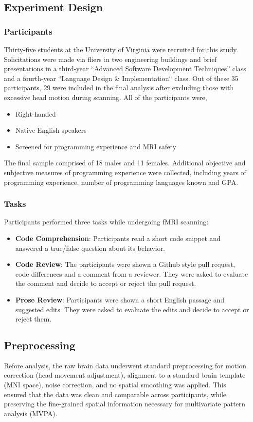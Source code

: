 \subsection{Experiment Design}
\subsubsection{Participants}
Thirty-five students at the University of Virginia were recruited for this study. Solicitations were made via fliers in two engineering buildings and brief presentations in a third-year “Advanced Software Development Techniques” class and a fourth-year “Language Design \& Implementation“ class. Out of these 35 participants, 29 were included in the final analysis after excluding those with excessive head motion during scanning. All of the participants were,
\begin{itemize}
    \item Right-handed
    \item Native English speakers
    \item Screened for programming experience and MRI safety
\end{itemize}
The final sample comprised of 18 males and 11 females. Additional objective and subjective measures of programming experience were collected, including years of programming experience, number of programming languages known and GPA.
\subsubsection{Tasks}
Participants performed three tasks while undergoing fMRI scanning:
\begin{itemize}
    \item \textbf{Code Comprehension}: Participants read a short code snippet and answered a true/false question about its behavior.
    \item \textbf{Code Review}: The participants were shown a Github style pull request, code differences and a comment from a reviewer. They were asked to evaluate the comment and decide to accept or reject the pull request.
    \item \textbf{Prose Review}: Participants were shown a short English passage and suggested edits. They were asked to evaluate the edits and decide to accept or reject them.
\end{itemize}
\subsection{Preprocessing}
Before analysis, the raw brain data underwent standard preprocessing for motion correction (head movement adjustment), alignment to a standard brain template (MNI space), noise correction, and no spatial smoothing was applied. This ensured that the data was clean and comparable across participants, while preserving the fine-grained spatial information necessary for multivariate pattern analysis (MVPA).
